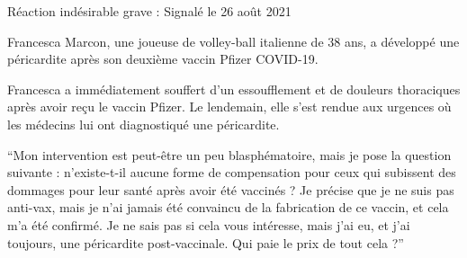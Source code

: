 Réaction indésirable grave : Signalé le 26 août 2021

Francesca Marcon, une joueuse de volley-ball italienne de 38 ans, a développé
une péricardite après son deuxième vaccin Pfizer COVID-19.

Francesca a immédiatement souffert d'un essoufflement et de douleurs thoraciques
après avoir reçu le vaccin Pfizer. Le lendemain, elle s'est rendue aux urgences
où les médecins lui ont diagnostiqué une péricardite.

``Mon intervention est peut-être un peu blasphématoire, mais je pose la question
suivante : n'existe-t-il aucune forme de compensation pour ceux qui subissent
des dommages pour leur santé après avoir été vaccinés ? Je précise que je ne
suis pas anti-vax, mais je n'ai jamais été convaincu de la fabrication de ce
vaccin, et cela m'a été confirmé. Je ne sais pas si cela vous intéresse, mais
j'ai eu, et j'ai toujours, une péricardite post-vaccinale. Qui paie le prix de
tout cela ?''
